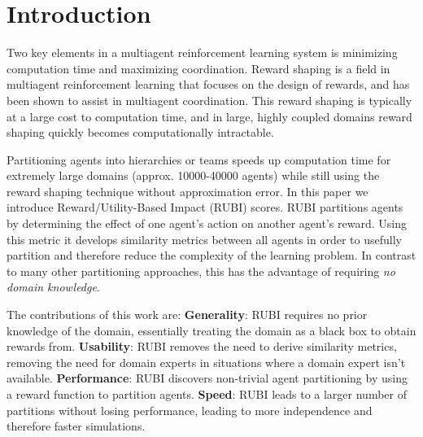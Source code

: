 \documentclass{aamas_extabstract}
\begin{document}


\section{Introduction}
Two key elements in a multiagent reinforcement learning system is minimizing computation time and maximizing coordination. Reward shaping is a field in multiagent reinforcement learning that focuses on the design of rewards, and has been shown to assist in multiagent coordination. This reward shaping is typically at a large cost to computation time, and in large, highly coupled domains reward shaping quickly becomes computationally intractable. 

Partitioning agents into hierarchies \cite{tumer-holmesparker_ala12} or teams \cite{Curran:2013:AHC:2484920.2485183} speeds up computation time for extremely large domains (approx. 10000-40000 agents) while still using the reward shaping technique without approximation error. In this paper we introduce Reward/Utility-Based Impact (RUBI) scores. RUBI partitions agents by determining the effect of one agent's action on another agent's reward. Using this metric it develops similarity metrics between all agents in order to usefully partition and therefore reduce the complexity of the learning problem. In contrast to many other partitioning approaches, this has the advantage of requiring \textit{no domain knowledge}.

The contributions of this work are: \textbf{Generality}: RUBI requires no prior knowledge of the domain, essentially treating the domain as a black box to obtain rewards from. \textbf{Usability}: RUBI removes the need to derive similarity metrics, removing the need for domain experts in situations where a domain expert isn't available. \textbf{Performance}: RUBI discovers non-trivial agent partitioning by using a reward function to partition agents. \textbf{Speed}: RUBI leads to a larger number of partitions without losing performance, leading to more independence and therefore faster simulations.

\end{document}
